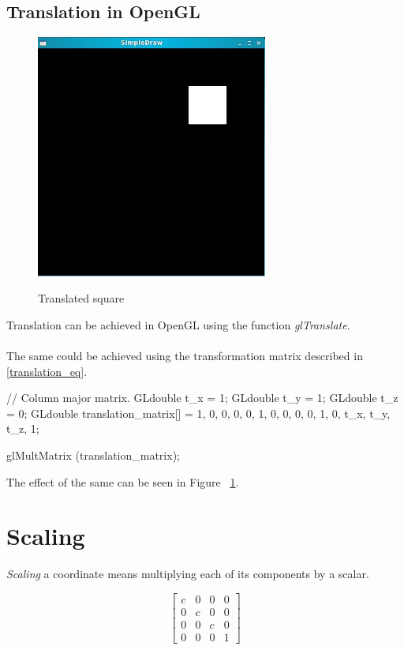 \documentclass[a4paper,12pt,titlepage,twosided]{article}
\begin{document}
	\subsection{Translation in OpenGL}
		\begin{figure}
			\includegraphics[height=80mm]{Images_final/Translated_square.jpg}
			\label{fig:translated}
			\caption{Translated square}
		\end{figure}
		Translation can be achieved in OpenGL using the function \emph{glTranslate}. \\ \\
		The same could be achieved using the transformation matrix described in \eqref{translation_eq}.
		\begin{code}
			// Column major matrix.
			GLdouble t_x = 1;
			GLdouble t_y = 1;
			GLdouble t_z = 0;
			GLdouble translation_matrix[] = { 1, 0, 0, 0,
							  0, 1, 0, 0,
							  0, 0, 1, 0,
							  t_x, t_y, t_z, 1};	

			glMultMatrix (translation_matrix);
		\end{code}
		The effect of the same can be seen in Figure ~\ref{fig:translated}.
	
		
\pagebreak
\pagebreak
\section{Scaling}
\emph{Scaling} a coordinate means multiplying each of its components by a scalar. 


\begin {equation*}
	\begin{bmatrix}
		c & 0 & 0 & 0 \\
		0 & c & 0 & 0 \\
		0 & 0 & c & 0 \\
		0 & 0 & 0 & 1
	\end{bmatrix}
\end{equation*}
\end{document}
